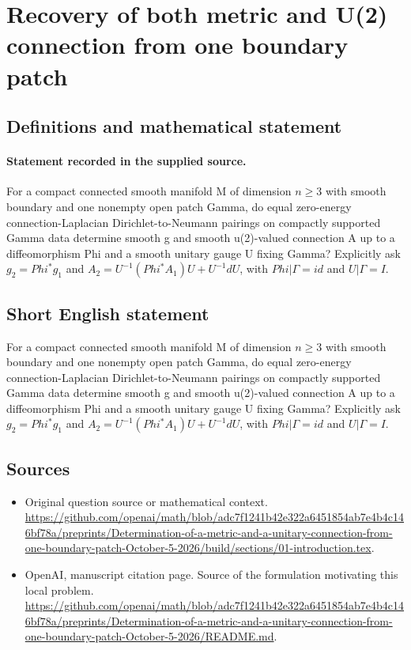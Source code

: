 \documentclass[11pt]{article}
\begin{document}
\section*{Recovery of both metric and U(2) connection from one boundary patch}\label{statement}
\subsection{Definitions and mathematical statement}
\paragraph{Statement recorded in the supplied source.}
For a compact connected smooth manifold M of dimension $n\geq 3$ with smooth boundary and one nonempty open patch Gamma, do equal zero-energy connection-Laplacian Dirichlet-to-Neumann pairings on compactly supported Gamma data determine smooth g and smooth u(2)-valued connection A up to a diffeomorphism Phi and a smooth unitary gauge U fixing Gamma? Explicitly ask $g_2=Phi^*g_1$ and $A_2=U^{-1}(Phi^*A_1)U+U^{-1}dU$, with $Phi|\Gamma =id$ and $U|\Gamma =I$.
\subsection{Short English statement}
For a compact connected smooth manifold M of dimension $n\geq 3$ with smooth boundary and one nonempty open patch Gamma, do equal zero-energy connection-Laplacian Dirichlet-to-Neumann pairings on compactly supported Gamma data determine smooth g and smooth u(2)-valued connection A up to a diffeomorphism Phi and a smooth unitary gauge U fixing Gamma? Explicitly ask $g_2=Phi^*g_1$ and $A_2=U^{-1}(Phi^*A_1)U+U^{-1}dU$, with $Phi|\Gamma =id$ and $U|\Gamma =I$.
\subsection{Sources}
\begin{itemize}
\item[S1] Original question source or mathematical context.
\url{https://github.com/openai/math/blob/adc7f1241b42e322a6451854ab7e4b4c146bf78a/preprints/Determination-of-a-metric-and-a-unitary-connection-from-one-boundary-patch-October-5-2026/build/sections/01-introduction.tex}.
\item[S2] OpenAI, manuscript citation page. Source of the formulation motivating this local problem.
\url{https://github.com/openai/math/blob/adc7f1241b42e322a6451854ab7e4b4c146bf78a/preprints/Determination-of-a-metric-and-a-unitary-connection-from-one-boundary-patch-October-5-2026/README.md}.
\end{itemize}
\end{document}
